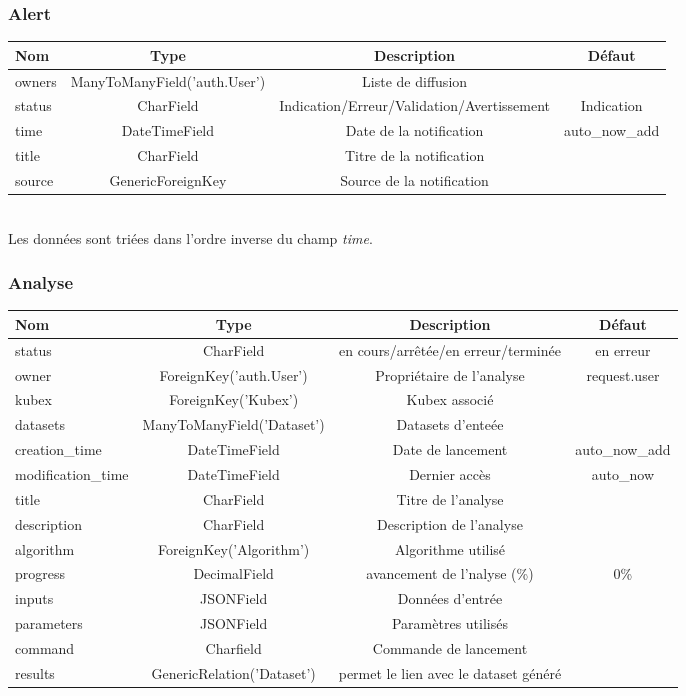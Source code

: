 \documentclass[a4paper]{report}
\begin{document}
\subsubsection{Alert}
\begin{adjustbox}{center}\begin{tabular}{|l|c|c|c|}
		\hline
		\textbf{Nom} & \textbf{Type} & \textbf{Description} & \textbf{Défaut}\\
		\hline
		owners & ManyToManyField('auth.User') & Liste de diffusion & \\
		status & CharField & Indication/Erreur/Validation/Avertissement & Indication \\
		time  & DateTimeField & Date de la notification & auto\_now\_add \\
		title & CharField & Titre de la notification & \\
		source & GenericForeignKey & Source de la notification & \\    
		\hline
\end{tabular}\end{adjustbox}

~\\
Les données sont triées dans l'ordre inverse du champ \emph{time}.

\subsubsection{Analyse}
\begin{adjustbox}{center}\begin{tabular}{|l|c|c|c|}
		\hline
		\textbf{Nom} & \textbf{Type} & \textbf{Description} & \textbf{Défaut}\\
		\hline
		status & CharField & en cours/arrêtée/en erreur/terminée & en erreur \\
		owner & ForeignKey('auth.User') & Propriétaire de l'analyse & request.user \\
		kubex & ForeignKey('Kubex') & Kubex associé & \\
		datasets & ManyToManyField('Dataset') & Datasets d'enteée & \\
		creation\_time & DateTimeField & Date de lancement & auto\_now\_add \\
		modification\_time & DateTimeField & Dernier accès & auto\_now \\
		title & CharField & Titre de l'analyse & \\
		description & CharField & Description de l'analyse & \\
		algorithm & ForeignKey('Algorithm') & Algorithme utilisé & \\
		progress  & DecimalField & avancement de l'nalyse (\%) & 0\% \\
		inputs & JSONField & Données d'entrée & \\
		parameters & JSONField & Paramètres utilisés & \\
		command & Charfield & Commande de lancement & \\
		results & GenericRelation('Dataset') & permet le lien avec le dataset généré & \\
		\hline
\end{tabular}\end{adjustbox}
\end{document}
